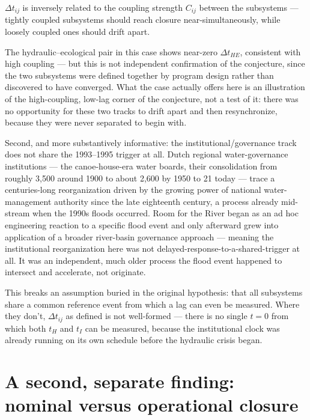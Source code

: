 \begin{conjecture}
$\Delta t_{ij}$ is inversely related to the coupling strength $C_{ij}$ between the subsystems --- tightly coupled subsystems should reach closure near-simultaneously, while loosely coupled ones should drift apart.
\end{conjecture}

The hydraulic--ecological pair in this case shows near-zero $\Delta t_{HE}$, consistent with high coupling --- but this is not independent confirmation of the conjecture, since the two subsystems were defined together by program design rather than discovered to have converged. What the case actually offers here is an illustration of the high-coupling, low-lag corner of the conjecture, not a test of it: there was no opportunity for these two tracks to drift apart and then resynchronize, because they were never separated to begin with.

Second, and more substantively informative: the institutional/governance track does not share the 1993--1995 trigger at all. Dutch regional water-governance institutions --- the canoe-house-era water boards, their consolidation from roughly 3{,}500 around 1900 to about 2{,}600 by 1950 to 21 today --- trace a centuries-long reorganization driven by the growing power of national water-management authority since the late eighteenth century, a process already mid-stream when the 1990s floods occurred. Room for the River began as an ad hoc engineering reaction to a specific flood event and only afterward grew into application of a broader river-basin governance approach --- meaning the institutional reorganization here was not delayed-response-to-a-shared-trigger at all. It was an independent, much older process the flood event happened to intersect and accelerate, not originate.

This breaks an assumption buried in the original hypothesis: that all subsystems share a common reference event from which a lag can even be measured. Where they don't, $\Delta t_{ij}$ as defined is not well-formed --- there is no single $t=0$ from which both $t_H$ and $t_I$ can be measured, because the institutional clock was already running on its own schedule before the hydraulic crisis began.

\section{A second, separate finding: nominal versus operational closure}

